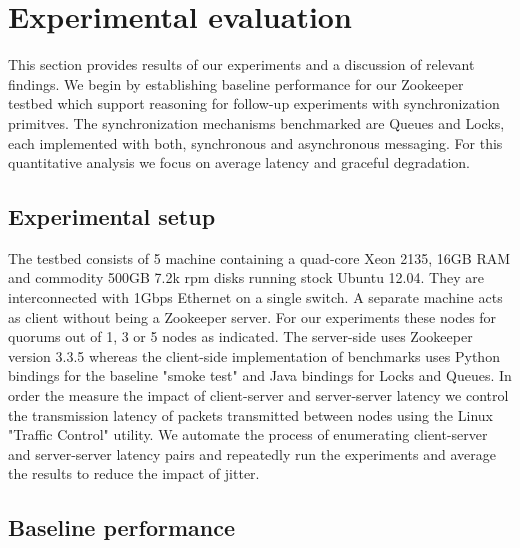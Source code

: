 \section{Experimental evaluation}\label{sec:eval}
This section provides results of our experiments and a discussion of relevant findings. We begin by establishing baseline performance for our Zookeeper testbed which support reasoning for follow-up experiments with synchronization primitves. The synchronization mechanisms benchmarked are Queues and Locks, each implemented with both, synchronous and asynchronous messaging. For this quantitative analysis we focus on average latency and graceful degradation.

\subsection{Experimental setup}
The testbed consists of 5 machine containing a quad-core Xeon 2135, 16GB RAM and commodity 500GB 7.2k rpm disks running stock Ubuntu 12.04. They are interconnected with 1Gbps Ethernet on a single switch. A separate machine acts as client without being a Zookeeper server. For our experiments these nodes for quorums out of 1, 3 or 5 nodes as indicated. The server-side uses Zookeeper version 3.3.5 whereas the client-side implementation of benchmarks uses Python bindings for the baseline "smoke test" and Java bindings for Locks and Queues.
In order the measure the impact of client-server and server-server latency we control the transmission latency of packets transmitted between nodes using the Linux "Traffic Control" utility. We automate the process of enumerating client-server and server-server latency pairs and repeatedly run the experiments and average the results to reduce the impact of jitter.



\subsection{Baseline performance}

